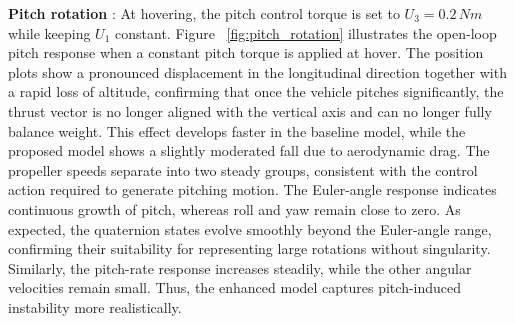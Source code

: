 

\textbf{Pitch rotation} : At hovering, the pitch control torque is set to $U_{3}=0.2\,Nm$ while keeping $U_{1}$ constant.
Figure ~\ref{fig:pitch_rotation} illustrates the open-loop pitch response when a constant pitch torque is applied at hover. The position plots show a pronounced displacement in the longitudinal direction together with a rapid loss of altitude, confirming that once the vehicle pitches significantly, the thrust vector is no longer aligned with the vertical axis and can no longer fully balance weight. This effect develops faster in the baseline model, while the proposed model shows a slightly moderated fall due to aerodynamic drag. The propeller speeds separate into two steady groups, consistent with the control action required to generate pitching motion. The Euler-angle response indicates continuous growth of pitch, whereas roll and yaw remain close to zero. As expected, the quaternion states evolve smoothly beyond the Euler-angle range, confirming their suitability for representing large rotations without singularity. Similarly, the pitch-rate response increases steadily, while the other angular velocities remain small. Thus, the enhanced model captures pitch-induced instability more realistically.





